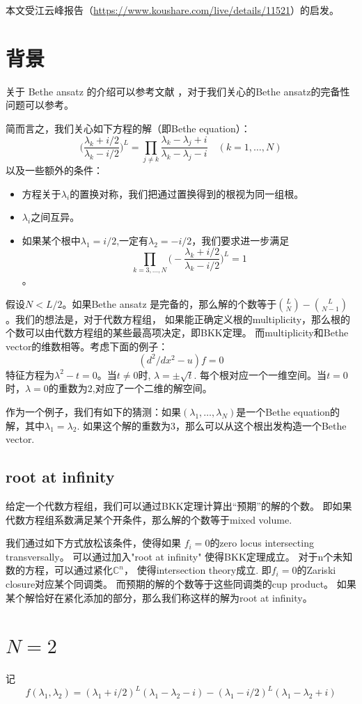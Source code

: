 本文受江云峰报告（\url{https://www.koushare.com/live/details/11521}）的启发。
\section{背景}
关于 Bethe ansatz 的介绍可以参考文献\cite{Slavnov2018} ，对于我们关心的Bethe ansatz的完备性问题可以参考\cite{Hao:2013jqa}。

简而言之，我们关心如下方程的解（即Bethe equation）：
\[\big( \frac{\lambda_k+i/2}{\lambda_k-i/2}\big)^L=\prod_{j\not=k}\frac{\lambda_k-\lambda_j+i}{\lambda_k-\lambda_j-i}\quad(k=1,\dots,N)\]
以及一些额外的条件：
\begin{itemize}
    \item 方程关于$\lambda_i$的置换对称，我们把通过置换得到的根视为同一组根。
    \item $\lambda_i$之间互异。
    \item 如果某个根中$\lambda_1=i/2$,一定有$\lambda_2=-i/2$，我们要求进一步满足
    \[\prod_{k=3,\dots,N}\big (-\frac{\lambda_k+i/2}{\lambda_k-i/2}\big )^L=1\]。
\end{itemize}
假设$N<L/2$。如果Bethe ansatz 是完备的，那么解的个数等于$\binom{L}{N}-\binom{L}{N-1}$。我们的想法是，对于代数方程组，
如果能正确定义根的multiplicity，那么根的个数可以由代数方程组的某些最高项决定，即BKK定理。
而multiplicity和Bethe vector的维数相等。考虑下面的例子：
\[(d^2/dx^2-u)f=0\]
特征方程为$\lambda^2-t=0$。当$t\not=0$时, $\lambda=\pm\sqrt{t}$.
每个根对应一个一维空间。当$t=0$时，$\lambda=0$的重数为$2$,对应了一个二维的解空间。

作为一个例子，我们有如下的猜测：如果$(\lambda_1,\dots,\lambda_N)$是一个Bethe equation的解，其中$\lambda_1=\lambda_2$.
如果这个解的重数为$3$，那么可以从这个根出发构造一个Bethe vector.
\subsection{root at infinity}
给定一个代数方程组，我们可以通过BKK定理计算出“预期”的解的个数。
即如果代数方程组系数满足某个开条件，那么解的个数等于mixed volume.

我们通过如下方式放松该条件，使得如果 $f_i=0$的zero locus intersecting transversally。
可以通过加入"root at infinity" 使得BKK定理成立。
对于n个未知数的方程，可以通过紧化$\mathbb{C}^n$，
使得intersection theory成立. 即$f_i=0$的Zariski closure对应某个同调类。
而预期的解的个数等于这些同调类的cup product。
如果某个解恰好在紧化添加的部分，那么我们称这样的解为root at infinity。

\section{$N=2$}
记\[f(\lambda_1,\lambda_2)=(\lambda_1+i/2)^L(\lambda_1-\lambda_2-i)-(\lambda_1-i/2)^L(\lambda_1-\lambda_2+i)\]

